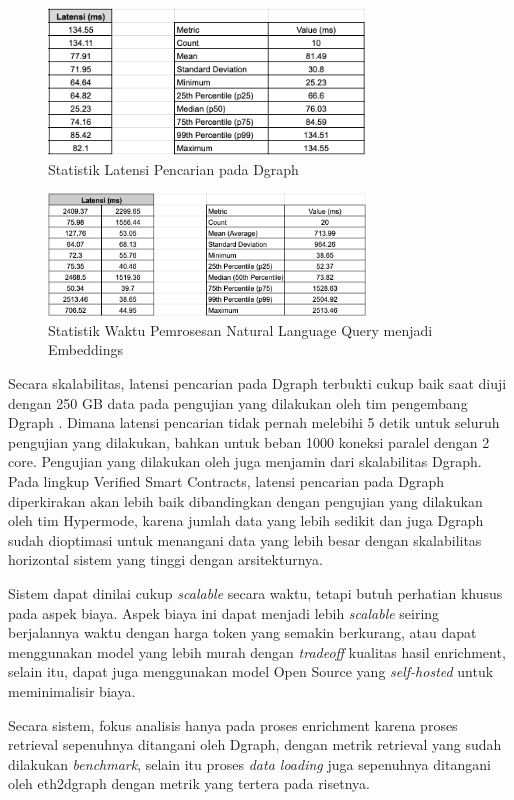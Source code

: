 \begin{figure}[ht]
	\centering
	\includegraphics[width=0.75\textwidth]{resources/chapter-4/data-latensi.png}
	\caption{Statistik Latensi Pencarian pada Dgraph}
	\label{image:latency-dgraph}
\end{figure}

\begin{figure}[ht]
	\centering
	\includegraphics[width=0.75\textwidth]{resources/chapter-4/data-latensi-embeddings.png}
	\caption{Statistik Waktu Pemrosesan Natural Language Query menjadi Embeddings}
	\label{image:latency-embeddings}
\end{figure}

Secara skalabilitas, latensi pencarian pada Dgraph terbukti cukup baik saat diuji dengan 250 GB data pada pengujian yang dilakukan oleh tim pengembang Dgraph \parencite{hypermode_performance}. Dimana latensi pencarian tidak pernah melebihi 5 detik untuk seluruh pengujian yang dilakukan, bahkan untuk beban 1000 koneksi paralel dengan 2 core. Pengujian yang dilakukan oleh \cite{ashwin2016distributed} juga menjamin dari skalabilitas Dgraph. Pada lingkup Verified Smart Contracts, latensi pencarian pada Dgraph diperkirakan akan lebih baik dibandingkan dengan pengujian yang dilakukan oleh tim Hypermode, karena jumlah data yang lebih sedikit dan juga Dgraph sudah dioptimasi untuk menangani data yang lebih besar dengan skalabilitas horizontal sistem yang tinggi dengan arsitekturnya.


Sistem dapat dinilai cukup \textit{scalable} secara waktu, tetapi butuh perhatian khusus pada aspek biaya. Aspek biaya ini dapat menjadi lebih \textit{scalable} seiring berjalannya waktu dengan harga token yang semakin berkurang, atau dapat menggunakan model yang lebih murah dengan \textit{tradeoff} kualitas hasil enrichment, selain itu, dapat juga menggunakan model Open Source yang \textit{self-hosted} untuk meminimalisir biaya.

Secara sistem, fokus analisis hanya pada proses enrichment karena proses retrieval sepenuhnya ditangani oleh Dgraph, dengan metrik retrieval yang sudah dilakukan \textit{benchmark}, selain itu proses \textit{data loading} juga sepenuhnya ditangani oleh eth2dgraph dengan metrik yang tertera pada risetnya.
